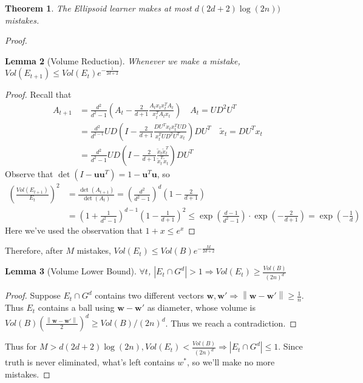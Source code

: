 \documentclass{book}
\newcommand{\nm}[1]{\left\|#1\right\|}
\newtheorem{Thm}{Theorem}[section]
\newtheorem{Lemma}[Thm]{Lemma}
\begin{document}
\begin{Thm}
  The Ellipsoid learner makes at most $d(2d+2)\log(2n))$ mistakes.
\end{Thm}
\begin{proof}
\begin{Lemma}[Volume Reduction]
  Whenever we make a mistake, $Vol(E_{t+1})\leq Vol(E_{t})e^{-\frac{1}{2d+2}}$
\end{Lemma}
\begin{proof}
  Recall that
  \[\begin{aligned}
      A_{t+1}&=\frac{d^{2}}{d^{2}-1}(A_{t}-\frac{2}{d+1}\frac{A_{t}x_{t}x_{t}^{T}A_{t}}{x^{T}_{t}A_{t}x_{t}})\quad A_{t}=UD^{2}U^{T}\\
      &=\frac{d^{2}}{d^{2-1}}UD(I-\frac{2}{d+1}\frac{DU^{T}x_{t}x_{t}^{T}UD}{x_{t}^{T}UD^{2}U^{T}x_{t}})DU^{T}\quad \tilde x_{t}=DU^{T}x_{t}\\
      &=\frac{d^{2}}{d^{2}-1}UD(I-\frac{2}{d+1}\frac{\tilde x_{t}\tilde x_{t}^{T}}{\tilde x^{T}_{t}\tilde x_{t}})DU^{T}
      \end{aligned}
    \]
    Observe that $\det(I-\bm u\bm u^{T})=1-\bm u^{T}\bm u$, so
    \[\begin{aligned}
        (\frac{Vol(E_{t+1})}{E_{t}})^{2}&=\frac{\det(A_{t+1})}{\det(A_{t})}=(\frac{d^{2}}{d^{2}-1})^{d}(1-\frac{2}{d+1})\\
        &=(1+\frac{1}{d^{2}-1})^{d-1}(1-\frac{1}{d+1})^{2}\leq \exp(\frac{d-1}{d^{2}-1})\cdot \exp(-\frac{2}{d+1})=\exp(-\frac{1}{d})
      \end{aligned}\]
    Here we've used the observation that $1+x\leq e^{x}$
\end{proof}
 Therefore, after $M$ mistakes, $Vol(E_{t})\leq Vol(B)e^{-\frac{M}{2d+2}}$
\begin{Lemma}[Volume Lower Bound]
  $\forall t$, $|E_{t}\cap G^{d}|>1\Rightarrow Vol(E_{t})\geq \frac{Vol(B)}{(2n)^{d}}$
\end{Lemma}

\begin{proof}
  Suppose $E_{t}\cap G^{d}$ contains two different vectors $\bm w,\bm w'\Rightarrow \nm{\bm w-\bm w'}\geq \frac{1}{n}$. Thus $E_{t}$ contains a ball using $\bm w-\bm w'$ as diameter, whose volume is $Vol(B)(\frac{\nm{\bm w-\bm w'}}{2})^{d}\geq Vol(B)/(2n)^{d}$. Thus we reach a contradiction.
\end{proof}

Thus for $M>d(2d+2)\log(2n),Vol(E_{t})<\frac{Vol(B)}{(2n)^{d}}\Rightarrow |E_{t}\cap G^{d}|\leq 1$. Since truth is never eliminated, what's left contains $w^{*}$, so we'll make no more mistakes.
\end{proof}
\end{document}
